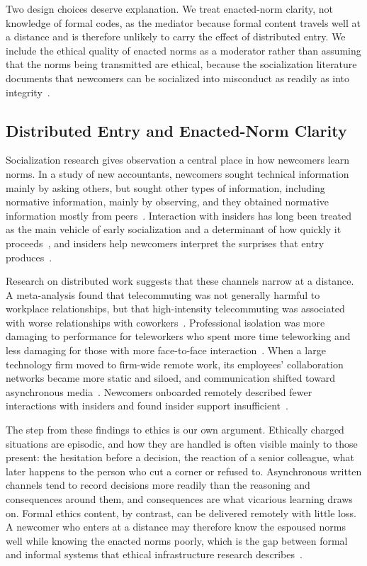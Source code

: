 Two design choices deserve explanation. We treat enacted-norm clarity, not knowledge of formal codes, as the mediator because formal content travels well at a distance and is therefore unlikely to carry the effect of distributed entry. We include the ethical quality of enacted norms as a moderator rather than assuming that the norms being transmitted are ethical, because the socialization literature documents that newcomers can be socialized into misconduct as readily as into integrity~\citep{ashforth2003normalization}.

\subsection{Distributed Entry and Enacted-Norm Clarity}

Socialization research gives observation a central place in how newcomers learn norms. In a study of new accountants, newcomers sought technical information mainly by asking others, but sought other types of information, including normative information, mainly by observing, and they obtained normative information mostly from peers~\citep{morrison1993newcomer}. Interaction with insiders has long been treated as the main vehicle of early socialization and a determinant of how quickly it proceeds~\citep{reichers1987interactionist}, and insiders help newcomers interpret the surprises that entry produces~\citep{louis1980surprise}.

Research on distributed work suggests that these channels narrow at a distance. A meta-analysis found that telecommuting was not generally harmful to workplace relationships, but that high-intensity telecommuting was associated with worse relationships with coworkers~\citep{gajendran2007good}. Professional isolation was more damaging to performance for teleworkers who spent more time teleworking and less damaging for those with more face-to-face interaction~\citep{golden2008impact}. When a large technology firm moved to firm-wide remote work, its employees' collaboration networks became more static and siloed, and communication shifted toward asynchronous media~\citep{yang2022effects}. Newcomers onboarded remotely described fewer interactions with insiders and found insider support insufficient~\citep{paik2026membership}.

The step from these findings to ethics is our own argument. Ethically charged situations are episodic, and how they are handled is often visible mainly to those present: the hesitation before a decision, the reaction of a senior colleague, what later happens to the person who cut a corner or refused to. Asynchronous written channels tend to record decisions more readily than the reasoning and consequences around them, and consequences are what vicarious learning draws on. Formal ethics content, by contrast, can be delivered remotely with little loss. A newcomer who enters at a distance may therefore know the espoused norms well while knowing the enacted norms poorly, which is the gap between formal and informal systems that ethical infrastructure research describes~\citep{tenbrunsel2003building}.


